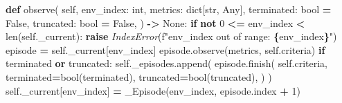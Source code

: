 \documentclass[
  chinese,
  11pt,
  letterpaper,
]{article}
\newenvironment{Shaded}{\begin{snugshade}}{\end{snugshade}}
\newcommand{\BuiltInTok}[1]{#1}
\newcommand{\ControlFlowTok}[1]{\textcolor[rgb]{0.13,0.29,0.53}{\textbf{#1}}}
\newcommand{\DecValTok}[1]{\textcolor[rgb]{0.00,0.00,0.81}{#1}}
\newcommand{\KeywordTok}[1]{\textcolor[rgb]{0.13,0.29,0.53}{\textbf{#1}}}
\newcommand{\NormalTok}[1]{#1}
\newcommand{\OperatorTok}[1]{\textcolor[rgb]{0.81,0.36,0.00}{\textbf{#1}}}
\newcommand{\PreprocessorTok}[1]{\textcolor[rgb]{0.56,0.35,0.01}{\textit{#1}}}
\newcommand{\SpecialCharTok}[1]{\textcolor[rgb]{0.81,0.36,0.00}{\textbf{#1}}}
\newcommand{\SpecialStringTok}[1]{\textcolor[rgb]{0.31,0.60,0.02}{#1}}
\newcommand{\VariableTok}[1]{\textcolor[rgb]{0.00,0.00,0.00}{#1}}
\renewenvironment{Shaded}{\par\smallskip}{\par\smallskip}
\begin{document}
\begin{Shaded}
\begin{Highlighting}[]
    \KeywordTok{def}\NormalTok{ observe(}
        \VariableTok{self}\NormalTok{,}
\NormalTok{        env\_index: }\BuiltInTok{int}\NormalTok{,}
\NormalTok{        metrics: }\BuiltInTok{dict}\NormalTok{[}\BuiltInTok{str}\NormalTok{, Any],}
\NormalTok{        terminated: }\BuiltInTok{bool} \OperatorTok{=} \VariableTok{False}\NormalTok{,}
\NormalTok{        truncated: }\BuiltInTok{bool} \OperatorTok{=} \VariableTok{False}\NormalTok{,}
\NormalTok{    ) }\OperatorTok{{-}\textgreater{}} \VariableTok{None}\NormalTok{:}
        \ControlFlowTok{if} \KeywordTok{not} \DecValTok{0} \OperatorTok{\textless{}=}\NormalTok{ env\_index }\OperatorTok{\textless{}} \BuiltInTok{len}\NormalTok{(}\VariableTok{self}\NormalTok{.\_current):}
            \ControlFlowTok{raise} \PreprocessorTok{IndexError}\NormalTok{(}\SpecialStringTok{f"env\_index out of range: }\SpecialCharTok{\{}\NormalTok{env\_index}\SpecialCharTok{\}}\SpecialStringTok{"}\NormalTok{)}
\NormalTok{        episode }\OperatorTok{=} \VariableTok{self}\NormalTok{.\_current[env\_index]}
\NormalTok{        episode.observe(metrics, }\VariableTok{self}\NormalTok{.criteria)}
        \ControlFlowTok{if}\NormalTok{ terminated }\KeywordTok{or}\NormalTok{ truncated:}
            \VariableTok{self}\NormalTok{.\_episodes.append(}
\NormalTok{                episode.finish(}
                    \VariableTok{self}\NormalTok{.criteria,}
\NormalTok{                    terminated}\OperatorTok{=}\BuiltInTok{bool}\NormalTok{(terminated),}
\NormalTok{                    truncated}\OperatorTok{=}\BuiltInTok{bool}\NormalTok{(truncated),}
\NormalTok{                )}
\NormalTok{            )}
            \VariableTok{self}\NormalTok{.\_current[env\_index] }\OperatorTok{=}\NormalTok{ \_Episode(env\_index, episode.index }\OperatorTok{+} \DecValTok{1}\NormalTok{)}


\end{Highlighting}
\end{Shaded}
\end{document}
